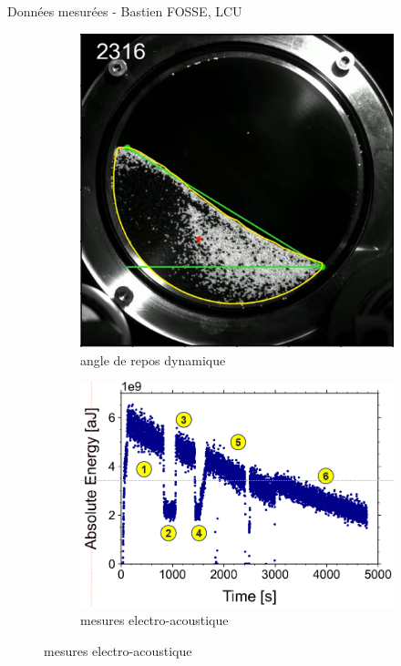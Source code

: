 \documentclass[aspectratio=169]{beamer} %
\begin{document}
\begin{frame}{Données mesurées - Bastien FOSSE, LCU}
\begin{figure}[t]
\begin{subfigure}[b]{0.3\textwidth}
{\begin{tcolorbox}[colframe=red, colback=white, boxrule=0.5mm, arc=0mm, outer arc=0mm, boxsep=0mm, left=0mm, right=0mm, top=0mm, bottom=0mm]
                    \includegraphics[width=\textwidth]{../CSI_2024/image/mesure_theta.png}
                \end{tcolorbox}}
            \caption*{angle de repos dynamique}

        \end{subfigure}
        \hfill
        \begin{subfigure}[b]{0.3\textwidth}
            \includegraphics[width=\textwidth]{../CSI_2024/image/mesure_ea.png}
            \caption*{mesures electro-acoustique}
        \end{subfigure}
    \end{figure}
\end{frame}
\end{document}
